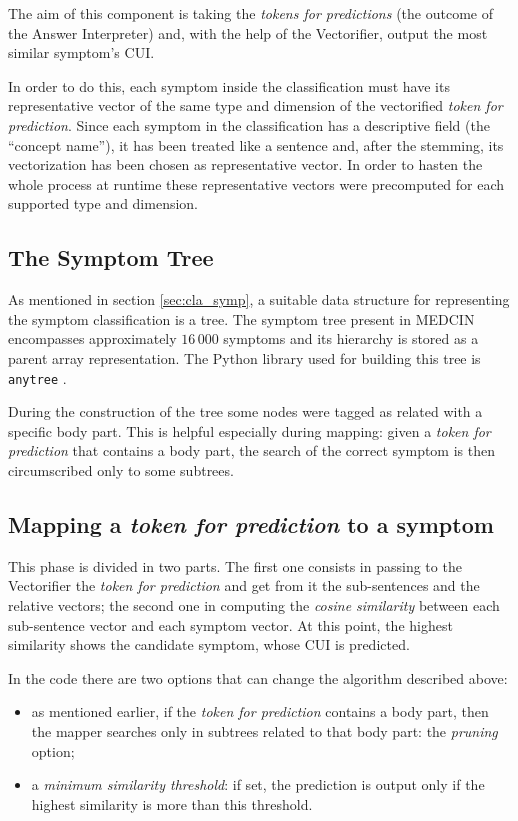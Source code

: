 The aim of this component is taking the \textit{tokens for predictions} (the outcome of the Answer Interpreter) and, with the help of the Vectorifier, output the most similar symptom's CUI.

In order to do this, each symptom inside the classification must have its representative vector of the same type and dimension of the vectorified \textit{token for prediction}. Since each symptom in the classification has a descriptive field (the ``concept name''), it has been treated like a sentence and, after the stemming, its vectorization has been chosen as representative vector. In order to hasten the whole process at runtime these representative vectors were precomputed for each supported type and dimension.

\subsection{The Symptom Tree}
As mentioned in section \ref{sec:cla_symp}, a suitable data structure for representing the symptom classification is a tree. The symptom tree present in MEDCIN encompasses approximately $16\,000$ symptoms and its hierarchy is stored as a parent array representation. The Python library used for building this tree is \texttt{anytree} \cite{anytree}.

During the construction of the tree some nodes were tagged as related with a specific body part. This is helpful especially during mapping: given a \textit{token for prediction} that contains a body part, the search of the correct symptom is then circumscribed only to some subtrees.

\subsection{Mapping a \textit{token for prediction} to a symptom}
This phase is divided in two parts. The first one consists in passing to the Vectorifier the \textit{token for prediction} and get from it the sub-sentences and the relative vectors; the second one in computing the \textit{cosine similarity} between each sub-sentence vector and each symptom vector. At this point, the highest similarity shows the candidate symptom, whose CUI is predicted.

In the code there are two options that can change the algorithm described above:
\begin{itemize}
  \item as mentioned earlier, if the \textit{token for prediction} contains a body part, then the mapper searches only in subtrees related to that body part: the \textit{pruning} option;
  \item a \textit{minimum similarity threshold}: if set, the prediction is output only if the highest similarity is more than this threshold. 
\end{itemize}
